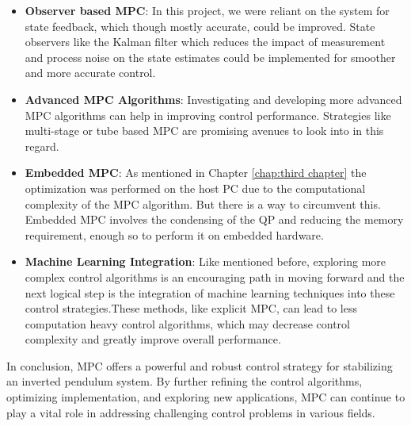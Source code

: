 \begin{itemize}
	
	\item \textbf{Observer based MPC}: In this project, we were reliant on the system for state feedback, which though mostly accurate, could be improved. State observers like the Kalman filter which reduces the impact of measurement and process noise on the state estimates could be implemented for smoother and more accurate control. 
	
	\item  \textbf{Advanced MPC Algorithms}: Investigating and developing more advanced MPC algorithms can help in improving control performance. Strategies like multi-stage or tube based MPC are promising avenues to look into in this regard.
	
	\item \textbf{Embedded MPC}: As mentioned in Chapter \ref{chap:third chapter} the optimization was performed on the host PC due to the computational complexity of the MPC algorithm. But there is a way to circumvent this. Embedded MPC involves the condensing of the QP and reducing the memory requirement, enough so to perform it on embedded hardware.
	
	\item \textbf{Machine Learning Integration}: Like mentioned before, exploring more complex control algorithms is an encouraging path in moving forward and the next logical step is the integration of machine learning techniques into these control strategies.These methods, like explicit MPC, can lead to less computation heavy control algorithms, which may decrease control complexity and greatly improve overall performance.
	
	
\end{itemize}


In conclusion, MPC offers a powerful and robust control strategy for stabilizing an inverted pendulum system. By further refining the control algorithms, optimizing implementation, and exploring new applications, MPC can continue to play a vital role in addressing challenging control problems in various fields.
